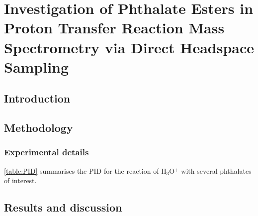 \chapter{Investigation of Phthalate Esters in Proton Transfer Reaction Mass Spectrometry via Direct Headspace Sampling}













\section{Introduction}




\section{Methodology}

\subsection{Experimental details}
\autoref{table:PID} summarises the PID for the reaction of H$_3$O$^+$ with several phthalates of interest.


\section{Results and discussion}

















